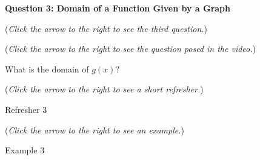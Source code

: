 \documentclass{ximera}
\begin{document}
\textbf{Question 3: Domain of a Function Given by a Graph}
\begin{question}
\begin{flushright}
{\color{blue}(\emph{Click the arrow to the right to see the third question.})}
\end{flushright}
\begin{center}
\begin{expandable}
{\color{blue}(\emph{Click the arrow to the right to see the question
posed in the video.})}
\begin{expandable}
What is the domain of $g(x)$?
\begin{multipleChoice}
\choice[correct]{$[-1,1)\cup(1,3]\cup[4,6]$}
\choice{$[-1,3]\cup[4,6]$}
\choice{$\{2\} \cup [6,15)$}
\choice{$\{2\}\cup [9,15)$}
\choice{$\{2\} \cup [6,9)$}
\end{multipleChoice}
\begin{flushright}
{\color{blue}(\emph{Click the arrow to the right to see a short refresher.})}
\end{flushright}
\begin{expandable}
Refresher 3
\end{expandable}
\begin{flushright}
{\color{blue}(\emph{Click the arrow to the right to see an example.})}
\end{flushright}
\begin{expandable}
Example 3
\end{expandable}
\end{expandable}
\end{expandable}
\end{center}
\end{question}
\end{document}
